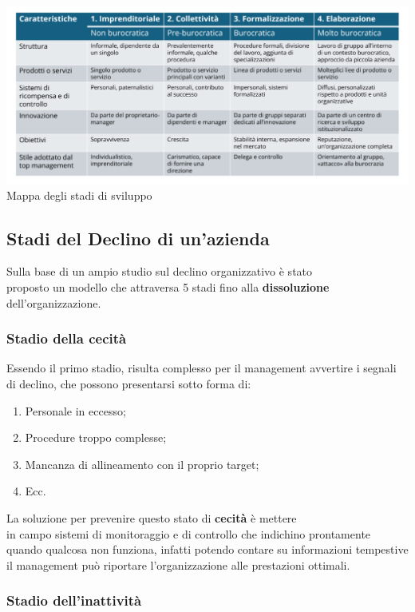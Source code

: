 \documentclass[14pt]{extarticle}
\begin{document}
\begin{center}
    \includegraphics[scale=0.50]{images/stati_sviluppo.png}
    Mappa degli stadi di sviluppo
\end{center}

\subsection{Stadi del Declino di un'azienda}

Sulla base di un ampio studio sul declino organizzativo è stato \\
proposto un modello che attraversa 5 stadi fino alla \textbf{dissoluzione}
dell'organizzazione.

\subsubsection{Stadio della cecità}

Essendo il primo stadio, risulta complesso per il management avvertire i segnali
di declino, che possono presentarsi sotto forma di:

\begin{enumerate}
    \item Personale in eccesso;
    \item Procedure troppo complesse;
    \item Mancanza di allineamento con il proprio target;
    \item Ecc. 
\end{enumerate}
La soluzione per prevenire questo stato di \textbf{cecità} è mettere \\ in campo
sistemi di monitoraggio e di controllo che indichino prontamente quando qualcosa
non funziona, infatti potendo contare su informazioni tempestive il management
può riportare l'organizzazione alle prestazioni ottimali.

\subsubsection{Stadio dell'inattività}
\end{document}
